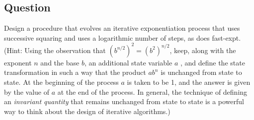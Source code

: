 \documentclass[
]{article}
\begin{document}
\hypertarget{question-14}{%
\subsection{Question}\label{question-14}}

Design a procedure that evolves an iterative exponentiation process that
uses successive squaring and uses a logarithmic number of steps, as does
fast-expt. (Hint: Using the observation that
\((b^{n/2})^2=(b^2)^{n/2}\), keep, along with the exponent \(n\) and the
base \(b\), an additional state variable \(a\) , and define the state
transformation in such a way that the product \({ab}^n\) is unchanged
from state to state. At the beginning of the process \(a\) is taken to
be 1, and the answer is given by the value of \(a\) at the end of the
process. In general, the technique of defining an \emph{invariant
quantity} that remains unchanged from state to state is a powerful way
to think about the design of iterative algorithms.)
\end{document}
